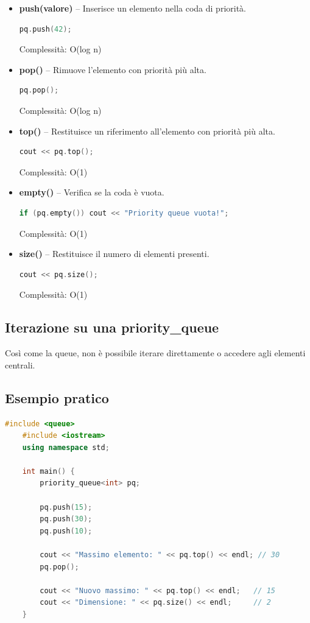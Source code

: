 \begin{itemize}
	\item \textbf{push(valore)} – Inserisce un elemento nella coda di priorità.
	\begin{lstlisting}[language=C++]
		pq.push(42);
	\end{lstlisting}
	Complessità: O(log n)
	
	\item \textbf{pop()} – Rimuove l’elemento con priorità più alta.
	\begin{lstlisting}[language=C++]
		pq.pop();
	\end{lstlisting}
	Complessità: O(log n)
	
	\item \textbf{top()} – Restituisce un riferimento all’elemento con priorità più alta.
	\begin{lstlisting}[language=C++]
		cout << pq.top();
	\end{lstlisting}
	Complessità: O(1)
	
	\item \textbf{empty()} – Verifica se la coda è vuota.
	\begin{lstlisting}[language=C++]
		if (pq.empty()) cout << "Priority queue vuota!";
	\end{lstlisting}
	Complessità: O(1)
	
	\item \textbf{size()} – Restituisce il numero di elementi presenti.
	\begin{lstlisting}[language=C++]
		cout << pq.size();
	\end{lstlisting}
	Complessità: O(1)
\end{itemize}

\subsection{Iterazione su una priority\_queue}
Così come la queue, non è possibile iterare direttamente o accedere agli elementi centrali.


\subsection{Esempio pratico}

\begin{lstlisting}[language=C++]
	#include <queue>
	#include <iostream>
	using namespace std;
	
	int main() {
		priority_queue<int> pq;
		
		pq.push(15);
		pq.push(30);
		pq.push(10);
		
		cout << "Massimo elemento: " << pq.top() << endl; // 30
		pq.pop();
		
		cout << "Nuovo massimo: " << pq.top() << endl;   // 15
		cout << "Dimensione: " << pq.size() << endl;     // 2
	}
\end{lstlisting}


